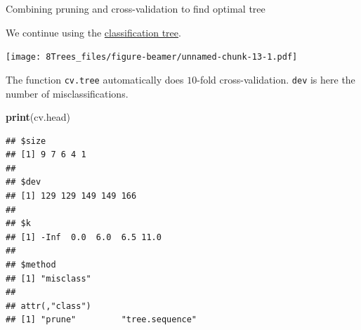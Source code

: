 \documentclass[10pt,ignorenonframetext,]{beamer}
\newenvironment{Shaded}{\begin{snugshade}}{\end{snugshade}}
\newcommand{\KeywordTok}[1]{\textcolor[rgb]{0.13,0.29,0.53}{\textbf{#1}}}
\newcommand{\DataTypeTok}[1]{\textcolor[rgb]{0.13,0.29,0.53}{#1}}
\newcommand{\DecValTok}[1]{\textcolor[rgb]{0.00,0.00,0.81}{#1}}
\newcommand{\StringTok}[1]{\textcolor[rgb]{0.31,0.60,0.02}{#1}}
\newcommand{\OperatorTok}[1]{\textcolor[rgb]{0.81,0.36,0.00}{\textbf{#1}}}
\newcommand{\NormalTok}[1]{#1}
\begin{document}
\begin{frame}[fragile]

\begin{block}{ Combining pruning and cross-validation to find optimal
tree}

We continue using the \href{classtree2}{classification tree}.

\begin{Shaded}
\end{Shaded}

\texttt{[image: 8Trees\_files/figure-beamer/unnamed-chunk-13-1.pdf]}

\end{block}

\end{frame}

\begin{frame}[fragile]

The function \texttt{cv.tree} automatically does \(10\)-fold
cross-validation. \texttt{dev} is here the number of misclassifications.

\begin{Shaded}
\begin{Highlighting}[]
\KeywordTok{print}\NormalTok{(cv.head)}
\end{Highlighting}
\end{Shaded}

\begin{verbatim}
## $size
## [1] 9 7 6 4 1
## 
## $dev
## [1] 129 129 149 149 166
## 
## $k
## [1] -Inf  0.0  6.0  6.5 11.0
## 
## $method
## [1] "misclass"
## 
## attr(,"class")
## [1] "prune"         "tree.sequence"
\end{verbatim}

\end{frame}
\end{document}
